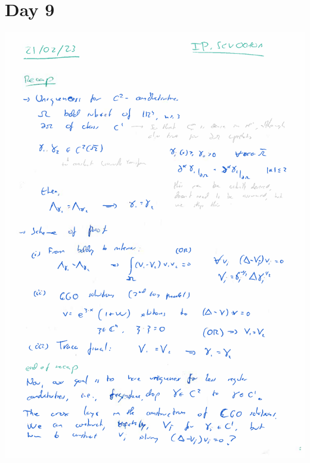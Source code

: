 \documentclass{article}
\begin{document}
\section*{Day 9}

\includegraphics[width=\textwidth]{screenshots/3.png}
\end{document}
